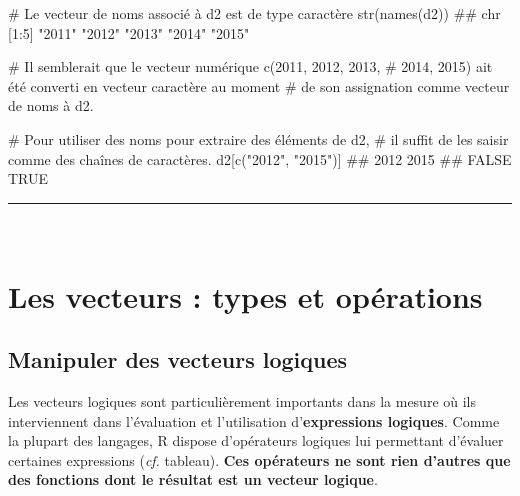 \documentclass[12pt,twosided, notitlepage]{book}
\newenvironment{Shaded}{}{}
\newcommand{\KeywordTok}[1]{\textcolor[rgb]{0.00,0.00,1.00}{#1}}
\newcommand{\StringTok}[1]{\textcolor[rgb]{0.00,0.50,0.50}{#1}}
\newcommand{\CommentTok}[1]{\textcolor[rgb]{0.00,0.50,0.00}{#1}}
\newcommand{\NormalTok}[1]{#1}
\renewenvironment{Shaded}{\begin{snugshade}}{\end{snugshade}}
\begin{document}
\begin{enumerate}
\begin{Shaded}
\begin{Highlighting}[]
\CommentTok{# Le vecteur de noms associé à d2 est de type caractère}
\KeywordTok{str}\NormalTok{(}\KeywordTok{names}\NormalTok{(d2))}
\NormalTok{  ##  chr [1:5] "2011" "2012" "2013" "2014" "2015"}

\CommentTok{# Il semblerait que le vecteur numérique c(2011, 2012, 2013, }
\CommentTok{# 2014, 2015) ait été converti en vecteur caractère au moment }
\CommentTok{# de son assignation comme vecteur de noms à d2. }

\CommentTok{# Pour utiliser des noms pour extraire des éléments de d2,}
\CommentTok{# il suffit de les saisir comme des chaînes de caractères.}
\NormalTok{d2[}\KeywordTok{c}\NormalTok{(}\StringTok{"2012"}\NormalTok{, }\StringTok{"2015"}\NormalTok{)]}
\NormalTok{  ##  2012  2015 }
\NormalTok{  ## FALSE  TRUE}
\end{Highlighting}
\end{Shaded}

  \begin{center} \rule{0.5\linewidth}{\linethickness}\end{center}

  \bigskip  \fi 
\end{enumerate}

~

\section{Les vecteurs : types et
opérations}\label{les-vecteurs-types-et-operations}

\subsection{Manipuler des vecteurs
logiques}\label{manipuler-des-vecteurs-logiques}

Les vecteurs logiques sont particulièrement importants dans la mesure où
ils interviennent dans l'évaluation et l'utilisation
d'\textbf{expressions logiques}. Comme la plupart des langages, R
dispose d'opérateurs logiques lui permettant d'évaluer certaines
expressions (\emph{cf.} tableau). \textbf{Ces opérateurs ne sont rien
d'autres que des fonctions dont le résultat est un vecteur logique}.
\end{document}
